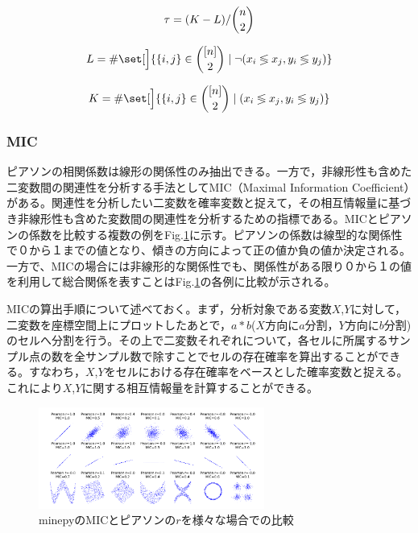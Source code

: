 \documentclass[review]{elsarticle}
\DeclarePairedDelimiter\set\{\}
\begin{document}
\begin{CJK}{UTF8}{min}
\begin{equation}\label{eq:kendall_tau}
\tau = (K-L)/\dbinom{n}{2}
\end{equation}

\begin{equation}\label{eq:kendall_L}
L = \# \set[\Big]{\{i,j\} \in \binom{[n]}{2} \mid \neg (x_i \lessgtr x_j, y_i \lessgtr y_j ) }
\end{equation}

\begin{equation}\label{eq:kendall_K}
K = \# \set[\Big]{\{i,j\} \in \binom{[n]}{2} \mid (x_i \lessgtr x_j, y_i \lessgtr y_j ) }
\end{equation}

\subsubsection{MIC}\label{mic}

ピアソンの相関係数は線形の関係性のみ抽出できる。一方で，非線形性も含めた二変数間の関連性を分析する手法としてMIC（Maximal Information Coefficient）がある\cite[][]{Reshef2011}。関連性を分析したい二変数を確率変数と捉えて，その相互情報量に基づき非線形性も含めた変数間の関連性を分析するための指標である。MICとピアソンの係数を比較する複数の例をFig.\ref{fig:mic}に示す。ピアソンの係数は線型的な関係性で０から１までの値となり、傾きの方向によって正の値か負の値か決定される。一方で、MICの場合には非線形的な関係性でも、関係性がある限り０から１の値を利用して総合関係を表すことはFig.\ref{fig:mic}の各例に比較が示される。

MICの算出手順について述べておく。まず，分析対象である変数\(X\),\(Y\)に対して，二変数を座標空間上にプロットしたあとで，\(a*b\)(\(X\)方向に\(a\)分割，\(Y\)方向に\(b\)分割)のセルへ分割を行う。その上で二変数それぞれについて，各セルに所属するサンプル点の数を全サンプル数で除すことでセルの存在確率を算出することができる。すなわち，\(X\),\(Y\)をセルにおける存在確率をベースとした確率変数と捉える。これにより\(X\),\(Y\)に関する相互情報量を計算することができる。

\begin{figure}[h]
\centering
\includegraphics[width=20em]{MIC_pearson_relationships.png}
\caption{minepyのMICとピアソンの\(r\)を様々な場合での比較}
\label{fig:mic}
\end{figure}


\end{CJK}
\end{document}
